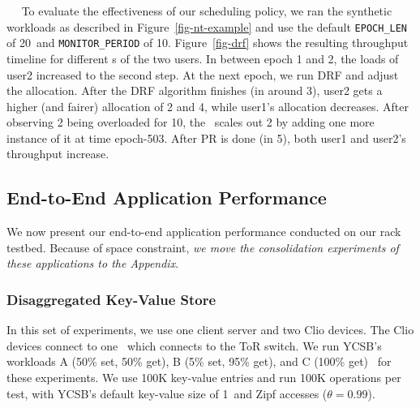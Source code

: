 ~~
To evaluate the effectiveness of our scheduling policy, we ran the synthetic workloads as described in Figure~\ref{fig-nt-example} and use the default \texttt{EPOCH\_LEN} of 20\mus\ and \texttt{MONITOR\_PERIOD} of 10\ms.
Figure~\ref{fig-drf} shows the resulting throughput timeline for different \nt{}s of the two users.
In between epoch 1 and 2, the loads of user2 increased to the second step.
At the next epoch, we run DRF and adjust the allocation. After the DRF algorithm finishes (in around 3\mus), user2 gets a higher (and fairer) allocation of \nt{}2 and \nt{}4, while user1's allocation decreases.
After observing \nt{}2 being overloaded for 10\ms, the \snic\ scales out \nt{}2 by adding one more instance of it at time epoch-503.
After PR is done (in 5\ms), both user1 and user2's throughput increase.



\subsection{End-to-End Application Performance}

We now present our end-to-end application performance conducted on our rack testbed. Because of space constraint, \textit{we move the consolidation experiments of these applications to the Appendix}.

\subsubsection{Disaggregated Key-Value Store}

In this set of experiments, we use one client server and two Clio devices. The Clio devices connect to one \snic\ which connects to the ToR switch. We run YCSB's workloads A (50\% set, 50\% get), B (5\% set, 95\% get), and C (100\% get)~\cite{ycsb-socc10} for these experiments. We use 100K key-value entries and run 100K operations per test, with YCSB's default key-value size of 1\KB\ and Zipf accesses ($\theta=0.99$). 

